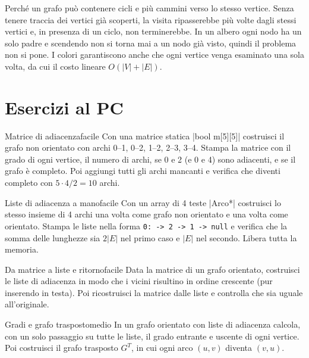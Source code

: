 \begin{orale}
Perché un grafo può contenere cicli e più cammini verso lo stesso vertice. Senza tenere
traccia dei vertici già scoperti, la visita ripasserebbe più volte dagli stessi vertici e,
in presenza di un ciclo, non terminerebbe. In un albero ogni nodo ha un solo padre e
scendendo non si torna mai a un nodo già visto, quindi il problema non si pone. I colori
garantiscono anche che ogni vertice venga esaminato una sola volta, da cui il costo
lineare $O(|V| + |E|)$.
\end{orale}

\section{Esercizi al PC}

\begin{esercizio}{Matrice di adiacenza}{facile}
Con una matrice statica \cc|bool m[5][5]| costruisci il grafo non orientato con archi 0--1,
0--2, 1--2, 2--3, 3--4. Stampa la matrice con il grado di ogni vertice, il numero di
archi, se 0 e 2 (e 0 e 4) sono adiacenti, e se il grafo è completo. Poi aggiungi tutti gli
archi mancanti e verifica che diventi completo con $5 \cdot 4 / 2 = 10$ archi.
\end{esercizio}

\begin{esercizio}{Liste di adiacenza a mano}{facile}
Con un array di 4 teste \cc|Arco*| costruisci lo stesso insieme di 4 archi una volta come
grafo non orientato e una volta come orientato. Stampa le liste nella forma
\texttt{0: -> 2 -> 1 -> null} e verifica che la somma delle lunghezze sia $2|E|$ nel primo
caso e $|E|$ nel secondo. Libera tutta la memoria.
\end{esercizio}

\begin{esercizio}{Da matrice a liste e ritorno}{facile}
Data la matrice di un grafo orientato, costruisci le liste di adiacenza in modo che i
vicini risultino in ordine crescente (pur inserendo in testa). Poi ricostruisci la
matrice dalle liste e controlla che sia uguale all'originale.
\end{esercizio}

\begin{esercizio}{Gradi e grafo trasposto}{medio}
In un grafo orientato con liste di adiacenza calcola, con un solo passaggio su tutte le
liste, il grado entrante e uscente di ogni vertice. Poi costruisci il grafo trasposto
$G^T$, in cui ogni arco $(u,v)$ diventa $(v,u)$.
\end{esercizio}

